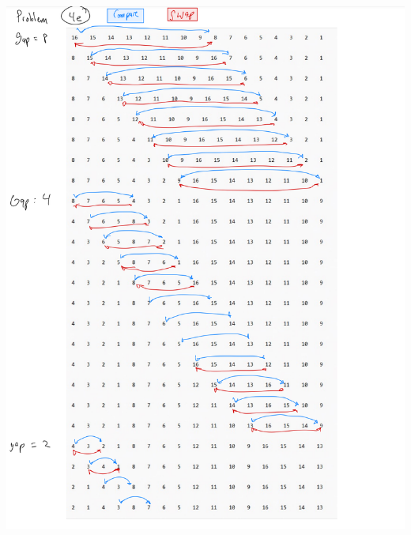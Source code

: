 \documentclass[11pt,largemargins]{homework}
\begin{document}
\begin{alphaparts}
  \includegraphics[width=1\textwidth]{pictures/hw1/4e1.png}

\end{alphaparts}
\end{document}
